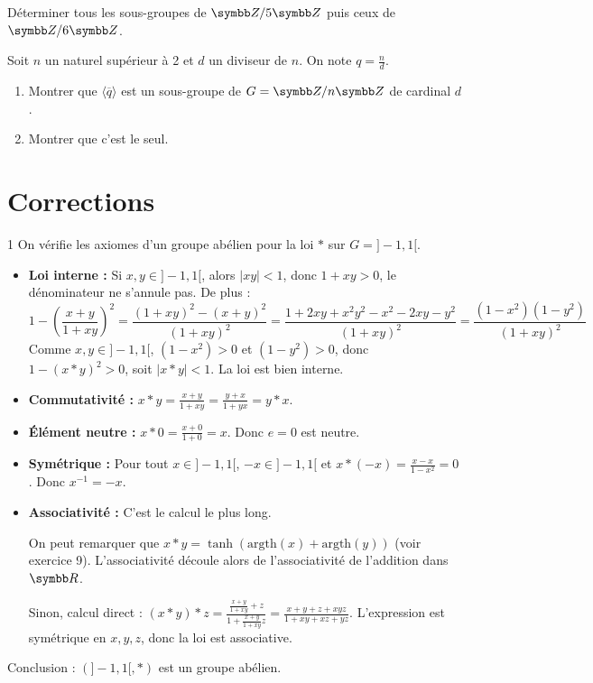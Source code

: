 \begin{exercice}
    Déterminer tous les sous-groupes de $\Z/5\Z$ puis ceux de $\Z/6\Z$.
\end{exercice}

\begin{exercice}
    Soit $n$ un naturel supérieur à 2 et $d$ un diviseur de $n$. On note $q=\frac{n}{d}$.
    \begin{enumerate}
        \item Montrer que $\langle \overline{q} \rangle$ est un sous-groupe de $G=\Z/n\Z$ de cardinal $d$.
        \item Montrer que c'est le seul.
    \end{enumerate}
\end{exercice}

\newpage
\section{Corrections}

\begin{correction}{1}
    On vérifie les axiomes d'un groupe abélien pour la loi $\ast$ sur $G=]-1,1[$.
    \begin{itemize}
        \item \textbf{Loi interne :} Si $x,y \in ]-1,1[$, alors $|xy| < 1$, donc $1+xy > 0$, le dénominateur ne s'annule pas. De plus :
            \[1 - \left(\frac{x+y}{1+xy}\right)^2 = \frac{(1+xy)^2 - (x+y)^2}{(1+xy)^2} = \frac{1+2xy+x^2y^2 - x^2-2xy-y^2}{(1+xy)^2} = \frac{(1-x^2)(1-y^2)}{(1+xy)^2}\]
            Comme $x,y \in ]-1,1[$, $(1-x^2) > 0$ et $(1-y^2) > 0$, donc $1 - (x \ast y)^2 > 0$, soit $|x \ast y| < 1$. La loi est bien interne.
        \item \textbf{Commutativité :} $x \ast y = \frac{x+y}{1+xy} = \frac{y+x}{1+yx} = y \ast x$.
        \item \textbf{Élément neutre :} $x \ast 0 = \frac{x+0}{1+0} = x$. Donc $e=0$ est neutre.
        \item \textbf{Symétrique :} Pour tout $x \in ]-1,1[$, $-x \in ]-1,1[$ et $x \ast (-x) = \frac{x-x}{1-x^2} = 0$. Donc $x^{-1} = -x$.
        \item \textbf{Associativité :} C'est le calcul le plus long.

        On peut remarquer que $x \ast y = \tanh(\text{argth}(x) + \text{argth}(y))$ (voir exercice 9). 
        L'associativité découle alors de l'associativité de l'addition dans $\R$.
        
        Sinon, calcul direct :
        $(x \ast y) \ast z = \frac{\frac{x+y}{1+xy} + z}{1 + \frac{x+y}{1+xy}z} = \frac{x+y+z+xyz}{1+xy+xz+yz}$.
        L'expression est symétrique en $x,y,z$, donc la loi est associative.
    \end{itemize}
    Conclusion : $(]-1,1[, \ast)$ est un groupe abélien.
\end{correction}

